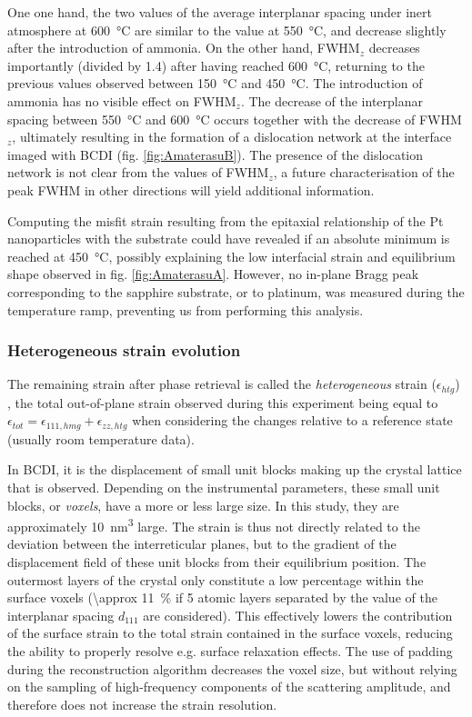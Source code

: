One one hand, the two values of the average interplanar spacing under inert atmosphere at \qty{600}{\degreeCelsius} are similar to the value at \qty{550}{\degreeCelsius}, and decrease slightly after the introduction of ammonia.
On the other hand, FWHM$_z$ decreases importantly (divided by \num{1.4}) after having reached \qty{600}{\degreeCelsius}, returning to the previous values observed between \qty{150}{\degreeCelsius} and \qty{450}{\degreeCelsius}.
The introduction of ammonia has no visible effect on FWHM$_z$.
The decrease of the interplanar spacing between \qty{550}{\degreeCelsius} and \qty{600}{\degreeCelsius} occurs together with the decrease of FWHM$_z$, ultimately resulting in the formation of a dislocation network at the interface imaged with BCDI (fig. \ref{fig:AmaterasuB}).
The presence of the dislocation network is not clear from the values of FWHM$_z$, a future characterisation of the peak FWHM in other directions will yield additional information.

Computing the misfit strain resulting from the epitaxial relationship of the Pt nanoparticles with the substrate could have revealed if an absolute minimum is reached at \qty{450}{\degreeCelsius}, possibly explaining the low interfacial strain and equilibrium shape observed in fig. \ref{fig:AmaterasuA}.
However, no in-plane Bragg peak corresponding to the sapphire substrate, or to platinum, was measured during the temperature ramp, preventing us from performing this analysis.

\subsubsection{Heterogeneous strain evolution}

The remaining strain after phase retrieval is called the \textit{heterogeneous} strain ($\epsilon_{htg}$) \parencite{Grediac1996, Favier2007, Atlan2023}, the total out-of-plane strain observed during this experiment being equal to $\epsilon_{tot} = \epsilon_{111, hmg} + \epsilon_{zz, htg}$ when considering the changes relative to a reference state (usually room temperature data).

In BCDI, it is the displacement of small unit blocks making up the crystal lattice that is observed.
Depending on the instrumental parameters, these small unit blocks, or \textit{voxels}, have a more or less large size.
In this study, they are approximately \qty{10}{\nm^3} large.
The strain is thus not directly related to the deviation between the interreticular planes, but to the gradient of the displacement field of these unit blocks from their equilibrium position.
The outermost layers of the crystal only constitute a low percentage within the surface voxels (\qty{\approx 11}{\percent} if 5 atomic layers separated by the value of the interplanar spacing $d_{111}$ are considered).
This effectively lowers the contribution of the surface strain to the total strain contained in the surface voxels, reducing the ability to properly resolve e.g. surface relaxation effects.
The use of padding during the reconstruction algorithm decreases the voxel size, but without relying on the sampling of high-frequency components of the scattering amplitude, and therefore does not increase the strain resolution.

